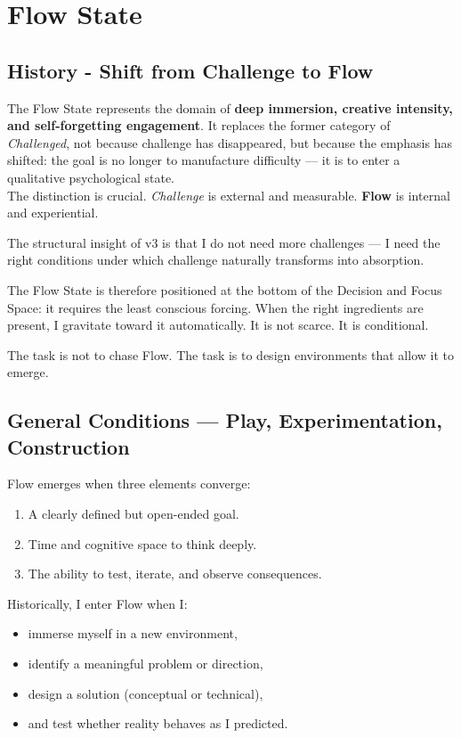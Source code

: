  
 \section{Flow State}
 
 \subsection{History - Shift from Challenge to Flow}
 The Flow State represents the domain of \textbf{deep immersion, creative intensity, and self-forgetting engagement}. It replaces the former category of \textit{Challenged}, not because challenge has disappeared, but because the emphasis has shifted: the goal is no longer to manufacture difficulty — it is to enter a qualitative psychological state.\\
 
 The distinction is crucial.  
 \textit{Challenge} is external and measurable.  
 \textbf{Flow} is internal and experiential.
 
 The structural insight of v3 is that I do not need more challenges — I need the right conditions under which challenge naturally transforms into absorption.
 
 The Flow State is therefore positioned at the bottom of the Decision and Focus Space: it requires the least conscious forcing. When the right ingredients are present, I gravitate toward it automatically. It is not scarce. It is conditional.
 
 The task is not to chase Flow.  
 The task is to design environments that allow it to emerge.
 
 \subsection{General Conditions — Play, Experimentation, Construction}
 
 Flow emerges when three elements converge:
 
 \begin{enumerate}
 	\item A clearly defined but open-ended goal.
 	\item Time and cognitive space to think deeply.
 	\item The ability to test, iterate, and observe consequences.
 \end{enumerate}
 
 Historically, I enter Flow when I:
 \begin{itemize}
 	\item immerse myself in a new environment,
 	\item identify a meaningful problem or direction,
 	\item design a solution (conceptual or technical),
 	\item and test whether reality behaves as I predicted.
 \end{itemize}
 
